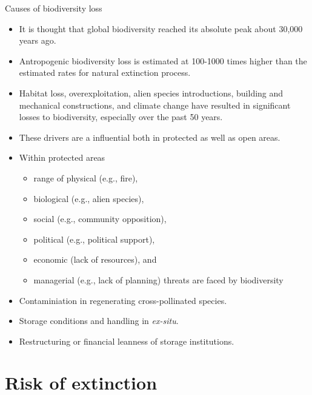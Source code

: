 \documentclass[
  ignorenonframetext,
  aspectratio=169]{beamer}
\providecommand{\tightlist}{%
  \setlength{\itemsep}{0pt}\setlength{\parskip}{0pt}}
\begin{document}
\begin{frame}{Causes of biodiversity loss}
\protect\hypertarget{causes-of-biodiversity-loss}{}
\footnotesize

\begin{itemize}
\tightlist
\item
  It is thought that global biodiversity reached its absolute peak about
  30,000 years ago.
\item
  Antropogenic biodiversity loss is estimated at 100-1000 times higher
  than the estimated rates for natural extinction process.
\item
  Habitat loss, overexploitation, alien species introductions, building
  and mechanical constructions, and climate change have resulted in
  significant losses to biodiversity, especially over the past 50 years.
\item
  These drivers are a influential both in protected as well as open
  areas.
\item
  Within protected areas

  \begin{itemize}
  \tightlist
  \item
    range of physical (e.g., fire),
  \item
    biological (e.g., alien species),
  \item
    social (e.g., community opposition),
  \item
    political (e.g., political support),
  \item
    economic (lack of resources), and
  \item
    managerial (e.g., lack of planning) threats are faced by
    biodiversity
  \end{itemize}
\item
  Contaminiation in regenerating cross-pollinated species.
\item
  Storage conditions and handling in \emph{ex-situ}.
\item
  Restructuring or financial leanness of storage institutions.
\end{itemize}
\end{frame}

\hypertarget{risk-of-extinction}{%
\section{Risk of extinction}\label{risk-of-extinction}}
\end{document}
